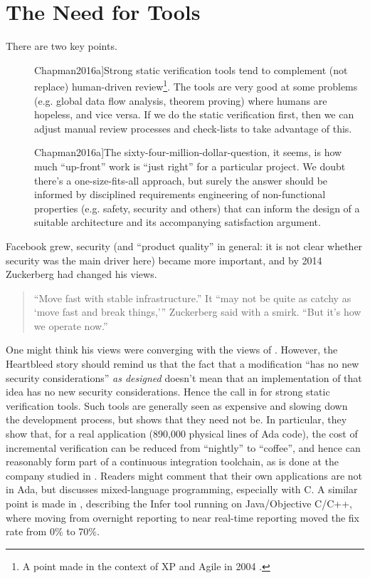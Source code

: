 \documentclass{llncs}
\begin{document}
\section{The Need for Tools}
\def\foo{\cite[\S 4.1]{Chapman2016a}}
\def\bar{\cite[\S 6]{Chapman2016a}}
There are two key points.
\begin{description}
\item[\foo]Strong static verification tools tend to complement (not replace) human-driven review\footnote{A point made in the context of XP and Agile in 2004 \cite{Wayrynenetal2004}.}. The tools are very good at some problems (e.g. global data flow analysis, theorem proving) where humans are hopeless, and vice versa. If we do the static verification first, then we can adjust manual review processes and check-lists to take advantage of this.
\item[\bar]The sixty-four-million-dollar-question, it seems, is how much ``up-front'' work is ``just right'' for a particular project. We doubt there’s a one-size-fits-all approach, but surely the answer should be informed by disciplined requirements engineering of non-functional properties (e.g. safety, security and others) that can inform the design of a suitable architecture and its accompanying satisfaction argument.
\end{description}
\par\noindent
Facebook grew, security (and ``product quality'' in general: it is not clear whether security was the main driver here) became more important, and by 2014 Zuckerberg had changed his views.
\begin{quote}
``Move fast with stable infrastructure.'' It ``may not be quite as catchy as `move fast and break things,''' Zuckerberg said with a smirk. ``But it's how we operate now.'' \cite{Statt2014a}
\end{quote}
\par\noindent
One might think his views were converging with the views of  \cite{Chapman2016a}. However, the Heartbleed story should remind us that the fact that a modification ``has no new security considerations''  \emph{as designed}  \cite{Seggelmannetal2012a} doesn't mean that an implementation of that idea has no new security considerations. Hence the call in \foo{} for strong static verification tools. Such tools are generally seen as expensive and slowing down the development process, but \cite{BrainSchanda2012a} shows that they need not be. In particular, they show that, for a real application (890,000 physical lines of Ada code), the cost of incremental verification can be reduced from ``nightly'' to ``coffee'', and hence can reasonably form part of a continuous integration toolchain, as is done at the company studied in \cite{BrainSchanda2012a}. Readers might  comment that their own applications are not in Ada, but \cite[\S5.6]{ChapmanMoy2018a} discusses mixed-language programming, especially with C.  A similar point is made in \cite{Distefanoetal2019a}, describing the Infer tool running on Java/Objective C/C++, where moving from overnight reporting to near real-time reporting moved the fix rate from 0\% to 70\%.
\end{document}
